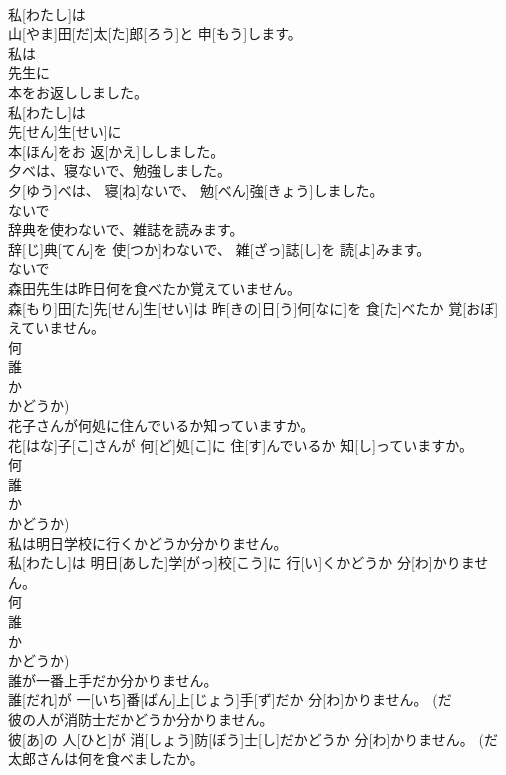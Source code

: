 \documentclass[8pt]{extreport}
\begin{document}
\begin{CJK}{UTF8}{min}
\\	私[わたし]は
\\	山[やま]田[だ]太[た]郎[ろう]と 申[もう]します。 
\\	私は
\\	先生に
\\	本をお返ししました。	
\\	私[わたし]は
\\	先[せん]生[せい]に
\\	本[ほん]をお 返[かえ]ししました。 
\\	夕べは、寝ないで、勉強しました。	
\\	夕[ゆう]べは、 寝[ね]ないで、 勉[べん]強[きょう]しました。 
\\	ないで 
\\	辞典を使わないで、雑誌を読みます。	
\\	辞[じ]典[てん]を 使[つか]わないで、 雑[ざっ]誌[し]を 読[よ]みます。 
\\	ないで 
\\	森田先生は昨日何を食べたか覚えていません。	
\\	森[もり]田[た]先[せん]生[せい]は 昨[きの]日[う]何[なに]を 食[た]べたか 覚[おぼ]えていません。 
\\	何 
\\	誰 
\\	か 
\\	かどうか)
\\	花子さんが何処に住んでいるか知っていますか。	
\\	花[はな]子[こ]さんが 何[ど]処[こ]に 住[す]んでいるか 知[し]っていますか。 
\\	何 
\\	誰 
\\	か 
\\	かどうか)
\\	私は明日学校に行くかどうか分かりません。	
\\	私[わたし]は 明日[あした]学[がっ]校[こう]に 行[い]くかどうか 分[わ]かりません。 
\\	何 
\\	誰 
\\	か 
\\	かどうか)
\\	誰が一番上手だか分かりません。	
\\	誰[だれ]が 一[いち]番[ばん]上[じょう]手[ず]だか 分[わ]かりません。 (だ 
\\	彼の人が消防士だかどうか分かりません。	
\\	彼[あ]の 人[ひと]が 消[しょう]防[ぼう]士[し]だかどうか 分[わ]かりません。 (だ 
\\	太郎さんは何を食べましたか。 

\end{CJK}
\end{document}
